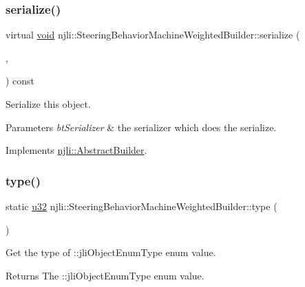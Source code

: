 \subsubsection{\texorpdfstring{serialize()}{serialize()}}
{\footnotesize\ttfamily virtual \mbox{\hyperlink{_thread_8h_af1e856da2e658414cb2456cb6f7ebc66}{void}} njli\+::\+Steering\+Behavior\+Machine\+Weighted\+Builder\+::serialize (\begin{DoxyParamCaption}\item[{\mbox{\hyperlink{_thread_8h_af1e856da2e658414cb2456cb6f7ebc66}{void}} $\ast$}]{,  }\item[{bt\+Serializer $\ast$}]{ }\end{DoxyParamCaption}) const\hspace{0.3cm}{\ttfamily [virtual]}}

Serialize this object.


\begin{DoxyParams}{Parameters}
{\em bt\+Serializer} & the serializer which does the serialize. \\
\hline
\end{DoxyParams}


Implements \mbox{\hyperlink{classnjli_1_1_abstract_builder_ab66b774e02ccb9da554c9aab7fa6d981}{njli\+::\+Abstract\+Builder}}.

\mbox{\label{classnjli_1_1_steering_behavior_machine_weighted_builder_a2199932c63e8817d99734ba34d6107e2}} 
\subsubsection{\texorpdfstring{type()}{type()}}
{\footnotesize\ttfamily static \mbox{\hyperlink{_util_8h_a10e94b422ef0c20dcdec20d31a1f5049}{u32}} njli\+::\+Steering\+Behavior\+Machine\+Weighted\+Builder\+::type (\begin{DoxyParamCaption}{ }\end{DoxyParamCaption})\hspace{0.3cm}{\ttfamily [static]}}

Get the type of \+::jli\+Object\+Enum\+Type enum value.

\begin{DoxyReturn}{Returns}
The \+::jli\+Object\+Enum\+Type enum value. 
\end{DoxyReturn}


